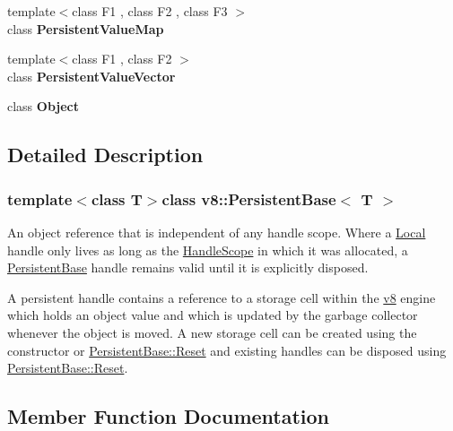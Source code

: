 \begin{DoxyCompactItemize}
\item 
\hypertarget{classv8_1_1_persistent_base_a401e5cd2db49a67497042617f01fdbc2}{}{\footnotesize template$<$class F1 , class F2 , class F3 $>$ }\\class {\bfseries Persistent\+Value\+Map}\label{classv8_1_1_persistent_base_a401e5cd2db49a67497042617f01fdbc2}

\item 
\hypertarget{classv8_1_1_persistent_base_a978bb1377559897d74d5fe883a54a315}{}{\footnotesize template$<$class F1 , class F2 $>$ }\\class {\bfseries Persistent\+Value\+Vector}\label{classv8_1_1_persistent_base_a978bb1377559897d74d5fe883a54a315}

\item 
\hypertarget{classv8_1_1_persistent_base_a0720b5f434e636e22a3ed34f847eec57}{}class {\bfseries Object}\label{classv8_1_1_persistent_base_a0720b5f434e636e22a3ed34f847eec57}

\end{DoxyCompactItemize}


\subsection{Detailed Description}
\subsubsection*{template$<$class T$>$class v8\+::\+Persistent\+Base$<$ T $>$}

An object reference that is independent of any handle scope. Where a \hyperlink{classv8_1_1_local}{Local} handle only lives as long as the \hyperlink{classv8_1_1_handle_scope}{Handle\+Scope} in which it was allocated, a \hyperlink{classv8_1_1_persistent_base}{Persistent\+Base} handle remains valid until it is explicitly disposed.

A persistent handle contains a reference to a storage cell within the \hyperlink{namespacev8}{v8} engine which holds an object value and which is updated by the garbage collector whenever the object is moved. A new storage cell can be created using the constructor or \hyperlink{classv8_1_1_persistent_base_a174bb1e45b18fd4eeaee033622825bb8}{Persistent\+Base\+::\+Reset} and existing handles can be disposed using \hyperlink{classv8_1_1_persistent_base_a174bb1e45b18fd4eeaee033622825bb8}{Persistent\+Base\+::\+Reset}. 

\subsection{Member Function Documentation}
\hypertarget{classv8_1_1_persistent_base_a4a64c26d91ed6a276aa8a7ca4bb7683a}{}
